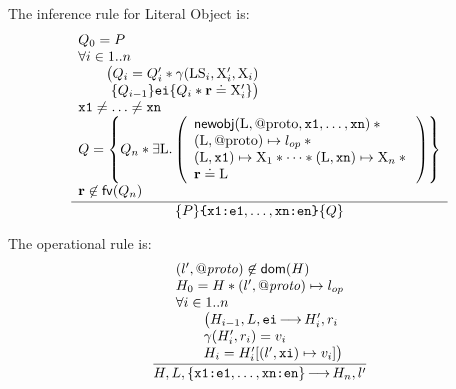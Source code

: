 \documentclass{article}
\begin{document}
The inference rule for Literal Object is:
\[\frac
{\begin{array}{l}
        Q_0 = P \\
        \forall i\in 1..n\\
\qquad\big(Q_i = Q_i'\sep\getValue(\V{LS}_i,\V{X}_i',\V{X}_i)\\
\qquad     ~\tr  {Q_{i-1}} {\js{ei}} {Q_i\sep\rv\doteq\V{X}_i'}\big)\\
        \js{x1} \neq \dots \neq \js{xn}\\ 
%
Q = \left\{ Q_n \sep \exists \V{L} \st \left(\begin{array}{l}
        \newobj(\V{L},\text{@proto},\js{x1},\dots,\js{xn}) \sep {}\\
        (\V{L},\text{@proto})\pointsto \lop \sep{}\\
        (\V{L},\js{x1})\pointsto\V{X}_1 \sep \dots \sep (\V{L},\js{xn})\pointsto\V{X}_n \sep{}\\
        \rv\doteq \V{L}
\end{array}\right)\right\}\\
%
\rv\not\in \fv(Q_n)\end{array}}
{\tr P {\js{\{x1}\js{:e1},\dots,\js{xn}\js{:en}\js{\}}} Q}
\]

The operational rule is:
\[\frac
{\begin{array}{l}
  (l',\protop) \not\in\domain(H) \\ %
  H_0 = H \sep (l',\protop)\pointsto \lop \\
  \forall i\in 1..n\\
  \qquad\big(H_{i-1},L,\js{ei}\levalsto H_i',\njs{r_i} \\ 
  \qquad\getValue(H_i',\njs{r_i}) = \njs{v_i}\\
  \qquad H_i = H_i' \semup{ (l',\js{xi}) \pointsto \njs{v_i}}\big)
  \end{array}}
{H,L,\{\js{x1:e1},\dots, \js{xn:en}\} \levalsto H_n,l'}
\]
\end{document}
